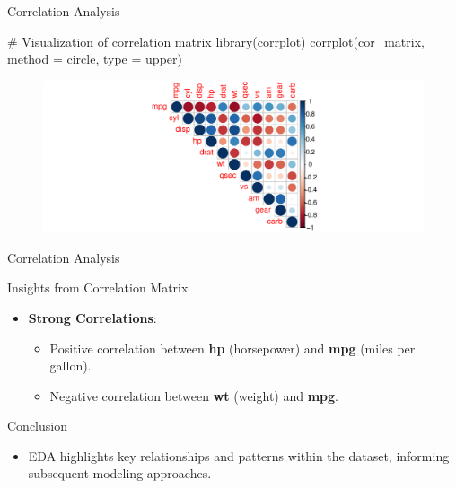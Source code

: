 \documentclass[
  18 pt,
  ignorenonframetext,
  aspectratio=1610,
]{beamer}
\newenvironment{Shaded}{\begin{snugshade}}{\end{snugshade}}
\newcommand{\AttributeTok}[1]{\textcolor[rgb]{0.40,0.45,0.13}{#1}}
\newcommand{\CommentTok}[1]{\textcolor[rgb]{0.37,0.37,0.37}{#1}}
\newcommand{\FunctionTok}[1]{\textcolor[rgb]{0.28,0.35,0.67}{#1}}
\newcommand{\NormalTok}[1]{\textcolor[rgb]{0.00,0.23,0.31}{#1}}
\newcommand{\StringTok}[1]{\textcolor[rgb]{0.13,0.47,0.30}{#1}}
\providecommand{\tightlist}{%
  \setlength{\itemsep}{0pt}\setlength{\parskip}{0pt}}\usepackage{longtable,booktabs,array}
\begin{document}
\begin{frame}[fragile]{Correlation Analysis}
\protect\hypertarget{correlation-analysis-1}{}
\tiny

\begin{Shaded}
\begin{Highlighting}[]
\CommentTok{\# Visualization of correlation matrix}
\FunctionTok{library}\NormalTok{(corrplot)}
\FunctionTok{corrplot}\NormalTok{(cor\_matrix,  }\AttributeTok{method =} \StringTok{\textquotesingle{}circle\textquotesingle{}}\NormalTok{, }\AttributeTok{type =} \StringTok{\textquotesingle{}upper\textquotesingle{}}\NormalTok{)}
\end{Highlighting}
\end{Shaded}

\begin{figure}

{\centering \includegraphics{R-Regression_files/figure-beamer/unnamed-chunk-9-1.pdf}

}

\end{figure}
\end{frame}

\begin{frame}{Correlation Analysis}
\protect\hypertarget{correlation-analysis-2}{}
\begin{block}{Insights from Correlation Matrix}
\protect\hypertarget{insights-from-correlation-matrix}{}
\begin{itemize}
\tightlist
\item
  \textbf{Strong Correlations}:

  \begin{itemize}
  \tightlist
  \item
    Positive correlation between \textbf{hp} (horsepower) and
    \textbf{mpg} (miles per gallon).
  \item
    Negative correlation between \textbf{wt} (weight) and \textbf{mpg}.
  \end{itemize}
\end{itemize}
\end{block}

\begin{block}{Conclusion}
\protect\hypertarget{conclusion}{}
\begin{itemize}
\tightlist
\item
  EDA highlights key relationships and patterns within the dataset,
  informing subsequent modeling approaches.
\end{itemize}

\normalsize
\end{block}
\end{frame}
\end{document}
